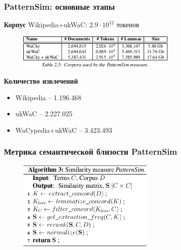 \begin{frame}
\frametitle{PatternSim: основные этапы}

\textbf{Корпус} Wikipedia+ukWaC: $2.9\cdot10^{12}$ токенов

\begin{figure}  
\centering
\includegraphics[width=0.7\textwidth]{figures/patternsim-table}
\end{figure}


\textbf{Количество извлечений}

\begin{itemize}
  \item Wikipedia -- 1.196.468 
  \item ukWaC -- 2.227.025 
  \item WaCypedia+ukWaC -- 3.423.493
\end{itemize}

\end{frame}





\begin{frame}
\frametitle{Метрика семантической близости PatternSim }

\begin{figure}  
\centering
\includegraphics[width=0.6\textwidth]{figures/patternsim-algo}
\end{figure}

\end{frame}



